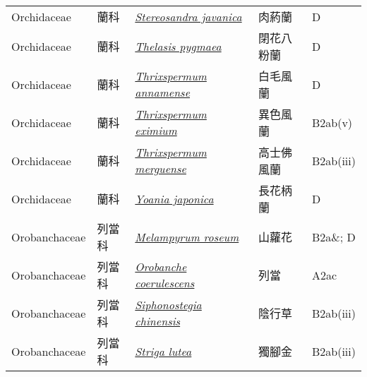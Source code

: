 {\begin{longtable}{p{2.5cm}p{2.5cm}p{4.5cm}p{2.5cm}p{3cm}}
    Orchidaceae & 蘭科 & \href{http://www.theplantlist.org/tpl1.1/search?q=Stereosandra+javanica}{\textit{Stereosandra javanica} } & 肉葯蘭 & D \index{Stereosandra@\textit{Stereosandra}!javanica@\textit{javanica}}  \index{肉葯蘭} \\
    Orchidaceae & 蘭科 & \href{http://www.theplantlist.org/tpl1.1/search?q=Thelasis+pygmaea}{\textit{Thelasis pygmaea} } & 閉花八粉蘭 & D \index{Thelasis@\textit{Thelasis}!pygmaea@\textit{pygmaea}}  \index{閉花八粉蘭} \\
    Orchidaceae & 蘭科 & \href{http://www.theplantlist.org/tpl1.1/search?q=Thrixspermum+annamense}{\textit{Thrixspermum annamense} } & 白毛風蘭 & D \index{Thrixspermum@\textit{Thrixspermum}!annamense@\textit{annamense}}  \index{白毛風蘭} \\
    Orchidaceae & 蘭科 & \href{http://www.theplantlist.org/tpl1.1/search?q=Thrixspermum+eximium}{\textit{Thrixspermum eximium} } & 異色風蘭 & B2ab(v) \index{Thrixspermum@\textit{Thrixspermum}!eximium@\textit{eximium}}  \index{異色風蘭} \\
    Orchidaceae & 蘭科 & \href{http://www.theplantlist.org/tpl1.1/search?q=Thrixspermum+merguense}{\textit{Thrixspermum merguense} } & 高士佛風蘭 & B2ab(iii) \index{Thrixspermum@\textit{Thrixspermum}!merguense@\textit{merguense}}  \index{高士佛風蘭} \\
    Orchidaceae & 蘭科 & \href{http://www.theplantlist.org/tpl1.1/search?q=Yoania+japonica}{\textit{Yoania japonica} } & 長花柄蘭 & D \index{Yoania@\textit{Yoania}!japonica@\textit{japonica}}  \index{長花柄蘭} \\
    Orobanchaceae & 列當科 & \href{http://www.theplantlist.org/tpl1.1/search?q=Melampyrum+roseum}{\textit{Melampyrum roseum} } & 山蘿花 & B2a\&; D \index{Melampyrum@\textit{Melampyrum}!roseum@\textit{roseum}}  \index{山蘿花} \\
    Orobanchaceae & 列當科 & \href{http://www.theplantlist.org/tpl1.1/search?q=Orobanche+coerulescens}{\textit{Orobanche coerulescens} } & 列當 & A2ac \index{Orobanche@\textit{Orobanche}!coerulescens@\textit{coerulescens}}  \index{列當} \\
    Orobanchaceae & 列當科 & \href{http://www.theplantlist.org/tpl1.1/search?q=Siphonostegia+chinensis}{\textit{Siphonostegia chinensis} } & 陰行草 & B2ab(iii) \index{Siphonostegia@\textit{Siphonostegia}!chinensis@\textit{chinensis}}  \index{陰行草} \\
    Orobanchaceae & 列當科 & \href{http://www.theplantlist.org/tpl1.1/search?q=Striga+lutea}{\textit{Striga lutea} } & 獨腳金 & B2ab(iii) \index{Striga@\textit{Striga}!lutea@\textit{lutea}}  \index{獨腳金} \\

\end{longtable}}
